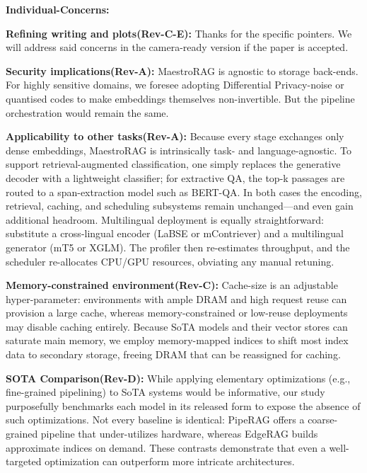 \textbf{Individual-Concerns:}

\textbf{Refining writing and plots(Rev-C-E):} Thanks for the specific pointers. We will address said concerns in the camera-ready version if the paper is accepted. 

\textbf{Security implications(Rev-A):} MaestroRAG is agnostic to storage back-ends. For highly sensitive domains, we foresee adopting Differential Privacy-noise or quantised codes to make embeddings themselves non-invertible. But the pipeline orchestration would remain the same.

\textbf{Applicability to other tasks(Rev-A):} Because every stage exchanges only dense embeddings, MaestroRAG is intrinsically task- and language-agnostic. To support retrieval-augmented classification, one simply replaces the generative decoder with a lightweight classifier; for extractive QA, the top-k passages are routed to a span-extraction model such as BERT-QA. In both cases the encoding, retrieval, caching, and scheduling subsystems remain unchanged—and even gain additional headroom. Multilingual deployment is equally straightforward: substitute a cross-lingual encoder (LaBSE or mContriever) and a multilingual generator (mT5 or XGLM). The profiler then re-estimates throughput, and the scheduler  re-allocates CPU/GPU resources, obviating any manual retuning.

\textbf{Memory-constrained environment(Rev-C):} Cache-size is an adjustable hyper-parameter: environments with ample DRAM and high request reuse can provision a large cache, whereas memory-constrained or low-reuse deployments may disable caching entirely. Because SoTA models and their vector stores can saturate main memory, we employ memory-mapped indices to shift most index data to secondary storage, freeing DRAM that can be reassigned for caching. 

\textbf{SOTA Comparison(Rev-D):} While applying elementary optimizations (e.g., fine-grained pipelining) to SoTA systems would be informative, our study purposefully benchmarks each model in its released form to expose the absence of such optimizations. Not every baseline is identical: PipeRAG offers a coarse-grained pipeline that under-utilizes hardware, whereas EdgeRAG builds approximate indices on demand. These contrasts demonstrate that even a well-targeted optimization can outperform more intricate architectures.